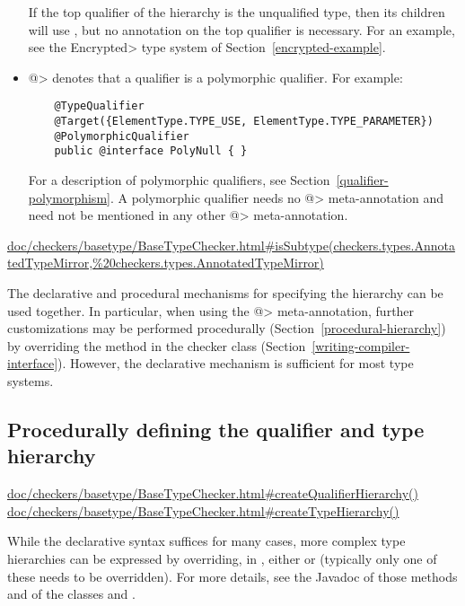 \begin{itemize}
  If the top qualifier of the hierarchy is the unqualified type, then its children
  will use , but no  annotation on the top qualifier is necessary.  For an example, see the
  \<Encrypted> type system of Section~\ref{encrypted-example}.

\item \<@> denotes that a qualifier is a
  polymorphic qualifier.  For example:

  \begin{Verbatim}
    @TypeQualifier
    @Target({ElementType.TYPE_USE, ElementType.TYPE_PARAMETER})
    @PolymorphicQualifier
    public @interface PolyNull { }
  \end{Verbatim}

  For a description of polymorphic qualifiers, see
  Section~\ref{qualifier-polymorphism}.  A polymorphic qualifier needs
  no \<@> meta-annotation and need not be
  mentioned in any other \<@>
  meta-annotation.

\end{itemize}

\urldef{\isSubtypeURL}\url{doc/checkers/basetype/BaseTypeChecker.html#isSubtype(checkers.types.AnnotatedTypeMirror,%20checkers.types.AnnotatedTypeMirror)}

The declarative and procedural mechanisms for specifying the hierarchy can
be used together.  In particular, when using the \<@>
meta-annotation, further customizations may be
performed procedurally (Section~\ref{procedural-hierarchy})
by overriding the  method in the checker class
(Section~\ref{writing-compiler-interface}).
However, the declarative mechanism is sufficient for most type systems.


\subsection{Procedurally defining the qualifier and type hierarchy\label{procedural-hierarchy}}

\urldef{\createQualifierHierarchyURL}\url{doc/checkers/basetype/BaseTypeChecker.html#createQualifierHierarchy()}
\urldef{\createTypeHierarchyURL}\url{doc/checkers/basetype/BaseTypeChecker.html#createTypeHierarchy()}

While the declarative syntax suffices for many cases, more complex
type hierarchies can be expressed by overriding, in ,
either  or  (typically
only one of these needs to be overridden).
For more details, see the Javadoc of those methods and of the classes
 and .

